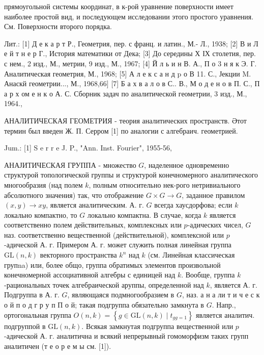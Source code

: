 \documentclass[10pt]{article}
\begin{document}
прямоугольной системы координат, в к-рой уравнение поверхности имеет наиболее простой вид, и последующем исследовании этого простого уравнения. См. Поверхности второго порядка.



Лит.: [1] Д е к а р т Р., Геометрия, пер. с франц. и латин., М.- Л., 1938; [2] В и Л е й т н е р Г., История математики от Дека; [3] До середины Х ІХ столетия, пер. с нем., 2 изд., М., метрии, 9 изд., М., 1967; [4] Й л ь и н В. А., П о 3 н я к Э. Г. Аналитическая геометрия, М., 1968; [5] А л е к с а н д p о В 11. С., Јекции $\mathrm{M}$. Анаскй геометрии..., М., 1968,66$]$ [7] Б а х в а л о в С.. В., М о д е н о в П. С., П а р х ом е н к о А. С. Сборник задач по аналитической геометрии, 3 изд., М., 1964.,



АНАЛИТИЧЕСКАЯ ГЕОМЕТРИЯ - теория аналитических пространств. Әтот термин был введен Ж. П. Серром [1] по аналогии с алгебраич. геометрией.



Jum.: [1] S e r r e J. P., "Ann. Inst. Fourier", 1955-56,



АНАЈИТИЧЕСКАЯ ГРУППА - множество $G$, наделенное одновременно структурой топологической группы и структурой конечномерного аналитического многообразия (над полем $k$, полным относительно нек-рого нетривиального абсолютного значения) так, что отображение $G \times G \rightarrow G$, заданное правилом $(x, y) \rightarrow x y$, является аналитическим. А. г. $G$ всегда хаусдорфова; если $k$ локально компактно, то $G$ локально компактна. В случае, когда $k$ является соответственно полем действительных, комплексных или $p$-адических чисел, $G$ наз. соответственно вещественной (действительной), комплексной или $p$-адической А. г. Примером А. г. может служить полная линейная группа $\mathrm{GL}(n, k)$ векторного пространства $k^{n}$ над $k$ (см. Линейная классическая групna) или, более общо, группа обратимых элементов произвольной конечномерной ассоциативной алгебры с единицей над $k$. Вообще, группа $k$-рациональных точек алгебраической аруппы, определенной над $k$, является А. г. Подгруппа в А. г. $G$, являющаяся подмногообразием в $G$, наз. а н а ли т и ч е с к о й п о д $г$ р у п П о й; такая подгруппа обязательно замкнута в $G$. Напр., ортогональная группа $O(n, k)=\left\{g \in \mathrm{GL}(n, k) \mid t_{g g=1}\right\}$ является аналитич. подгруппой в $\mathrm{GL}(n, k)$. Всякая замкнутая подгруппа вещественной или $p$-адической А. г. аналитична и всякий непрерывный гомоморфизм таких групп аналитичен (т е о р е м ы см. [1]).
\end{document}
